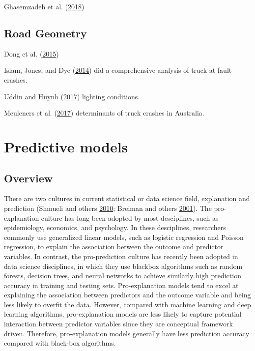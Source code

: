 \documentclass[12pt]{book}
\numberwithin{equation}{chapter}
\begin{document}
Ghasemzadeh et al. (\protect\hyperlink{ref-ghasemzadeh2018parametric}{2018})

\hypertarget{road-geometry}{%
\subsection{Road Geometry}\label{road-geometry}}

Dong et al. (\protect\hyperlink{ref-dong2015assessment}{2015})

Islam, Jones, and Dye (\protect\hyperlink{ref-islam2014comprehensive}{2014}) did a comprehensive analysis of truck at-fault crashes.

Uddin and Huynh (\protect\hyperlink{ref-uddin2017truck}{2017}) lighting conditions.

Meuleners et al. (\protect\hyperlink{ref-meuleners2017determinants}{2017}) determinants of truck crashes in Australia.

\hypertarget{predictive-models}{%
\section{Predictive models}\label{predictive-models}}

\hypertarget{overview}{%
\subsection{Overview}\label{overview}}

There are two cultures in current statistical or data science field, explanation and prediction (Shmueli and others \protect\hyperlink{ref-shmueli2010explain}{2010}; Breiman and others \protect\hyperlink{ref-breiman2001statistical}{2001}). The pro-explanation culture has long been adopted by most desciplines, such as epidemiology, economics, and psychology. In these desciplines, researchers commonly use generalized linear models, such as logistic regression and Poisson regression, to explain the association between the outcome and predictor variables. In contrast, the pro-prediction culture has recently been adopted in data science disciplines, in which they use blackbox algorithms such as random forests, decision trees, and neural networks to achieve similarly high prediction accuracy in training and testing sets. Pro-explanation models tend to excel at explaining the association between predictors and the outcome variable and being less likely to overfit the data. However, compared with machine learning and deep learning algorithms, pro-explanation models are less likely to capture potential interaction between predictor variables since they are conceptual framework driven. Therefore, pro-explanation models generally have less prediction accuracy compared with black-box algorithms.
\end{document}
